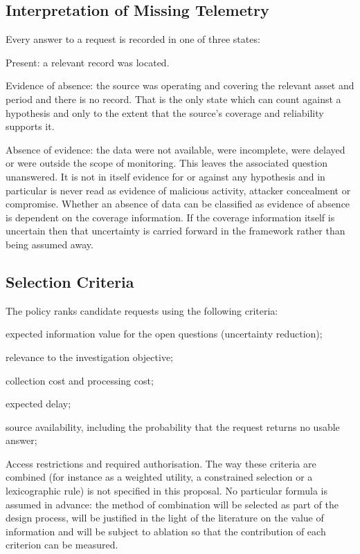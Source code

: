 \documentclass[a4paper,11pt]{article}
\begin{document}
\subsection{Interpretation of Missing Telemetry}
Every answer to a request is recorded in one of three states:\par
Present: a relevant record was located.\par
Evidence of absence: the source was operating and covering the relevant asset and period and there is no record. That is the only state which can count against a hypothesis and only to the extent that the source's coverage and reliability supports it.\par
Absence of evidence: the data were not available, were incomplete, were delayed or were outside the scope of monitoring. This leaves the associated question unanswered. It is not in itself evidence for or against any hypothesis and in particular is never read as evidence of malicious activity, attacker concealment or compromise. Whether an absence of data can be classified as evidence of absence is dependent on the coverage information. If the coverage information itself is uncertain then that uncertainty is carried forward in the framework rather than being assumed away.\par
\subsection{Selection Criteria}
The policy ranks candidate requests using the following criteria:\par
expected information value for the open questions (uncertainty reduction);\par
relevance to the investigation objective;\par
collection cost and processing cost;\par
expected delay;\par
source availability, including the probability that the request returns no usable answer;\par
Access restrictions and required authorisation. The way these criteria are combined (for instance as a weighted utility, a constrained selection or a lexicographic rule) is not specified in this proposal. No particular formula is assumed in advance: the method of combination will be selected as part of the design process, will be justified in the light of the literature on the value of information and will be subject to ablation so that the contribution of each criterion can be measured.\par
\end{document}
